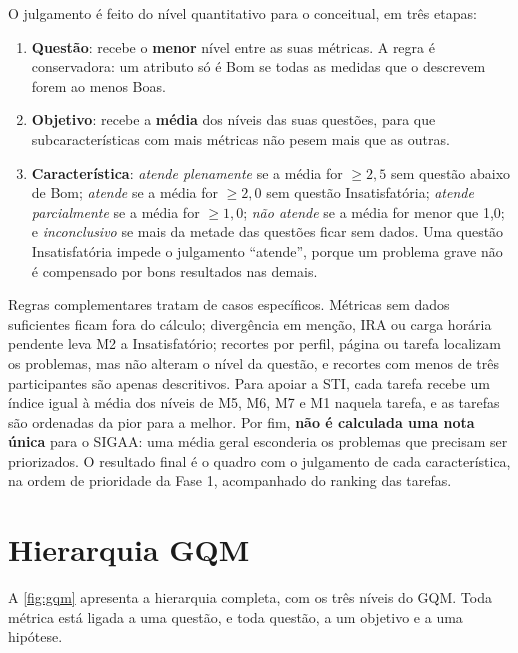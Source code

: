 O julgamento é feito do nível quantitativo para o conceitual, em três etapas:

\begin{enumerate}
	\item \textbf{Questão}: recebe o \textbf{menor} nível entre as suas métricas. A regra é conservadora: um atributo só é Bom se todas as medidas que o descrevem forem ao menos Boas.
	\item \textbf{Objetivo}: recebe a \textbf{média} dos níveis das suas questões, para que subcaracterísticas com mais métricas não pesem mais que as outras.
	\item \textbf{Característica}: \textit{atende plenamente} se a média for $\geq 2{,}5$ sem questão abaixo de Bom; \textit{atende} se a média for $\geq 2{,}0$ sem questão Insatisfatória; \textit{atende parcialmente} se a média for $\geq 1{,}0$; \textit{não atende} se a média for menor que 1,0; e \textit{inconclusivo} se mais da metade das questões ficar sem dados. Uma questão Insatisfatória impede o julgamento ``atende'', porque um problema grave não é compensado por bons resultados nas demais.
\end{enumerate}

Regras complementares tratam de casos específicos. Métricas sem dados suficientes ficam fora do cálculo; divergência em menção, IRA ou carga horária pendente leva M2 a Insatisfatório; recortes por perfil, página ou tarefa localizam os problemas, mas não alteram o nível da questão, e recortes com menos de três participantes são apenas descritivos. Para apoiar a STI, cada tarefa recebe um índice igual à média dos níveis de M5, M6, M7 e M1 naquela tarefa, e as tarefas são ordenadas da pior para a melhor. Por fim, \textbf{não é calculada uma nota única} para o SIGAA: uma média geral esconderia os problemas que precisam ser priorizados. O resultado final é o quadro com o julgamento de cada característica, na ordem de prioridade da Fase 1, acompanhado do ranking das tarefas.

\section{Hierarquia GQM}
\label{sec:hierarquia}

A \autoref{fig:gqm} apresenta a hierarquia completa, com os três níveis do GQM. Toda métrica está ligada a uma questão, e toda questão, a um objetivo e a uma hipótese.

